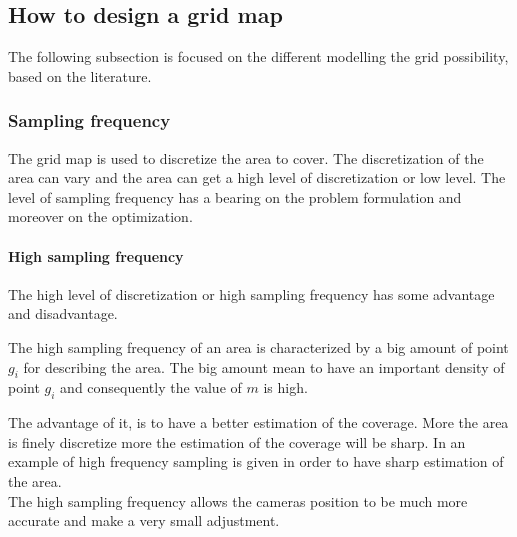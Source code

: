 \subsection{How to design a grid map }%
The following subsection is focused on the different  modelling the grid possibility, based on the literature. 

\subsubsection{Sampling frequency} %
The grid map is used to discretize the area to cover. The discretization of the area can vary and the area can get a high level of discretization or low level. The level of sampling frequency has a bearing on the problem formulation and moreover on the optimization.

\paragraph*{High sampling frequency}
The high level of discretization or high sampling frequency has some advantage and disadvantage.
 
The high sampling frequency of an area is characterized by a big amount of point $g_i$ for describing the area. The big amount mean to have an important density of point $g_i$ and consequently the value of $m$ is high. 

%
The advantage of it, is to have a better estimation of the coverage. More the area is finely discretize more the estimation of the coverage will be sharp. In \citep{171*horster2006} an example of high frequency sampling is given in order to have sharp estimation of the area. \\
The high sampling frequency allows the cameras position to be much more accurate and make a very small adjustment.


